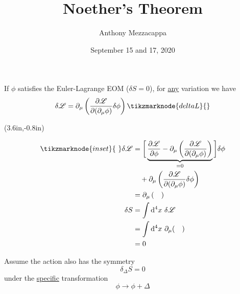 \documentclass{article}
\title{Noether's Theorem}
\author{Anthony Mezzacappa}
\date{September 15 and 17, 2020}
\begin{document}
\setlength{\parskip}{1em}

\maketitle

\noindent If $\phi$ satisfies the Euler-Lagrange EOM ($\delta S = 0$), for \underline{any} variation we have
\begin{equation*}
    \delta \mathscr{L} = \partial_\mu \left( \dfrac{ \partial \mathscr{L} }{ \partial ( \partial_\mu \phi ) } \delta \phi \right) \tikzmarknode{deltaL}{}
\end{equation*}

{%
\begin{textblock*}{3.3in}(3.6in,-0.8in)%
\begin{minipage}[h!]{3.3in}
    \small%
    \begin{center}
    \end{center}
    \vspace*{-12pt} \begin{align*}
        \tikzmarknode{inset}{~} \delta \mathscr{L} &= \bigg[ \underbrace{ \dfrac{ \partial \mathscr{L} }{ \partial \phi } - \partial_\mu \left( \dfrac{ \partial \mathscr{L} }{ \partial ( \partial_\mu \phi ) } \right) }_{=0} \bigg] \delta \phi \\
        &\quad + \partial_\mu \left( \dfrac{ \partial \mathscr{L} }{ \partial ( \partial_\mu \phi ) } \delta \phi \right) \\
        &= \partial_\mu \left( \quad \right) \\
        \delta S &= \int \mathrm{d}^4 x~ \delta \mathscr{L} \\
        &= \int \mathrm{d}^4 x~ \partial_\mu ( \quad ) \\
        &= 0
    \end{align*}
\end{minipage}%
\end{textblock*}%
}%

\vspace*{-18pt} \noindent Assume the action also has the symmetry
\begin{equation*}
    \delta_\Delta S = 0
\end{equation*}
under the \underline{specific} transformation
\begin{equation*}
    \phi \longrightarrow \phi + \Delta
\end{equation*}
\end{document}
